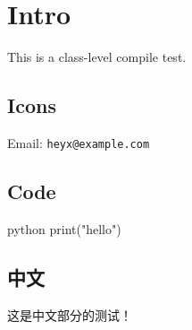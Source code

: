 \documentclass[shorthand=false,indent=true,boxes=true,refs=true,algorithm=true,code=true]{Hypo-Note}
\begin{document}
\makecover
\tableofcontents

\section{Intro}
This is a class-level compile test.

\subsection{Icons}
Email:  \texttt{heyx@example.com}

\subsection{Code}
\begin{hypocode}[linenos=true]{python}
print("hello")
\end{hypocode}
\subsection{中文}
这是中文部分的测试！
\end{document}
